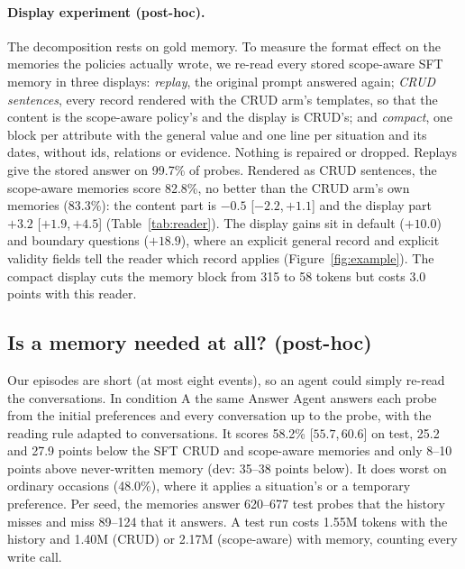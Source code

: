 \documentclass[11pt]{article}
\newcommand{\iv}[2]{[$#1$,\,$#2$]}
\begin{document}
\paragraph{Display experiment (post-hoc).} The decomposition rests on gold memory. To measure the format effect on the memories the policies actually wrote, we re-read every stored scope-aware SFT memory in three displays: \emph{replay}, the original prompt answered again; \emph{CRUD sentences}, every record rendered with the CRUD arm's templates, so that the content is the scope-aware policy's and the display is CRUD's; and \emph{compact}, one block per attribute with the general value and one line per situation and its dates, without ids, relations or evidence. Nothing is repaired or dropped. Replays give the stored answer on 99.7\% of probes. Rendered as CRUD sentences, the scope-aware memories score 82.8\%, no better than the CRUD arm's own memories (83.3\%): the content part is $-0.5$ \iv{-2.2}{+1.1} and the display part $+3.2$ \iv{+1.9}{+4.5} (Table~\ref{tab:reader}). The display gains sit in default ($+10.0$) and boundary questions ($+18.9$), where an explicit general record and explicit validity fields tell the reader which record applies (Figure~\ref{fig:example}). The compact display cuts the memory block from 315 to 58 tokens but costs 3.0 points with this reader.

\subsection{Is a memory needed at all? (post-hoc)}
Our episodes are short (at most eight events), so an agent could simply re-read the conversations. In condition A the same Answer Agent answers each probe from the initial preferences and every conversation up to the probe, with the reading rule adapted to conversations. It scores 58.2\% \iv{55.7}{60.6} on test, 25.2 and 27.9 points below the SFT CRUD and scope-aware memories and only 8--10 points above never-written memory (dev: 35--38 points below). It does worst on ordinary occasions (48.0\%), where it applies a situation's or a temporary preference. Per seed, the memories answer 620--677 test probes that the history misses and miss 89--124 that it answers. A test run costs 1.55M tokens with the history and 1.40M (CRUD) or 2.17M (scope-aware) with memory, counting every write call.
\end{document}
